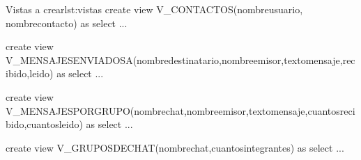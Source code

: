 \begin{homeworkProblem}
\begin{itemize}
  \begin{listadosql}{Vistas a crear}{lst:vistas}
  create view V_CONTACTOS(nombreusuario, nombrecontacto) as
  select ...
  
  create view V_MENSAJESENVIADOSA(nombredestinatario,nombreemisor,textomensaje,recibido,leido) as
  select ...
  
  create view V_MENSAJESPORGRUPO(nombrechat,nombreemisor,textomensaje,cuantosrecibido,cuantosleido) as
  select ...
    
  create view V_GRUPOSDECHAT(nombrechat,cuantosintegrantes) as
  select ...
\end{listadosql}
    
\end{itemize}

\end{homeworkProblem}

